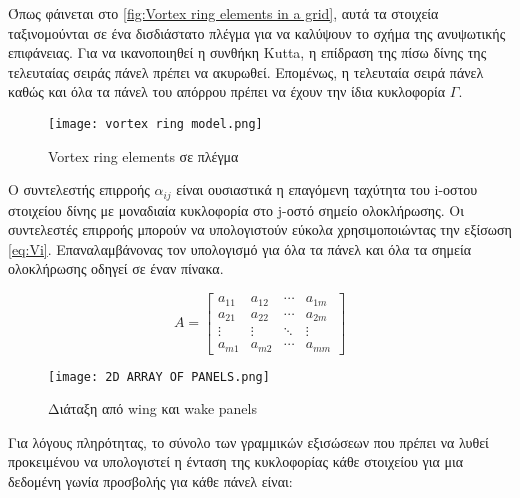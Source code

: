 Όπως φάινεται στο \autoref{fig:Vortex ring elements in a grid}, αυτά τα στοιχεία ταξινομούνται σε ένα δισδιάστατο πλέγμα για να καλύψουν το σχήμα της ανυψωτικής επιφάνειας. Για να ικανοποιηθεί η συνθήκη \textlatin{Kutta}, η επίδραση της πίσω δίνης της τελευταίας σειράς πάνελ πρέπει να ακυρωθεί. Επομένως, η τελευταία σειρά πάνελ καθώς και όλα τα πάνελ του απόρρου πρέπει να έχουν την ίδια κυκλοφορία $\Gamma$.

\begin{figure}[H]
    \centering
    \texttt{[image: vortex ring model.png]}
    \caption{\textlatin{Vortex ring elements} σε πλέγμα \cite{katz2001}}
    \label{fig:Vortex ring elements in a grid}
\end{figure}


Ο συντελεστής επιρροής \(\alpha_{ij}\) είναι ουσιαστικά η επαγόμενη ταχύτητα του \textlatin{i}-οστου στοιχείου δίνης με μοναδιαία κυκλοφορία στο \textlatin{j}-οστό σημείο ολοκλήρωσης. Οι συντελεστές επιρροής μπορούν να υπολογιστούν εύκολα χρησιμοποιώντας την εξίσωση \eqref{eq:Vi}. Επαναλαμβάνονας τον υπολογισμό για όλα τα πάνελ και όλα τα σημεία ολοκλήρωσης οδηγεί σε έναν πίνακα.

\begin{equation}
A = \begin{bmatrix}
a_{11} & a_{12} & \cdots & a_{1m} \\
a_{21} & a_{22} & \cdots & a_{2m} \\
 \vdots & \vdots & \ddots & \vdots \\
a_{m1} & a_{m2} & \cdots & a_{mm}
\end{bmatrix}
\end{equation}

\begin{figure}[H]
  \centering
  \texttt{[image: 2D ARRAY OF PANELS.png]}
  \caption{Διάταξη από \textlatin{wing} και \textlatin{wake panels} \cite{katz2001}}
\end{figure}

Για λόγους πληρότητας, το σύνολο των γραμμικών εξισώσεων που πρέπει να λυθεί προκειμένου να υπολογιστεί η ένταση της κυκλοφορίας κάθε στοιχείου για μια δεδομένη γωνία προσβολής για κάθε πάνελ είναι:

